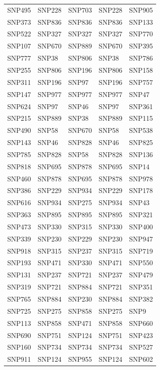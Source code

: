 \begin{table}[ht]
\begin{tabular}{lllll}
  SNP495 & SNP228 & SNP703 & SNP228 & SNP905 \\ 
  SNP373 & SNP836 & SNP836 & SNP836 & SNP133 \\ 
  SNP522 & SNP327 & SNP327 & SNP327 & SNP770 \\ 
  SNP107 & SNP670 & SNP889 & SNP670 & SNP395 \\ 
  SNP777 & SNP38 & SNP806 & SNP38 & SNP786 \\ 
  SNP255 & SNP806 & SNP196 & SNP806 & SNP158 \\ 
  SNP311 & SNP196 & SNP97 & SNP196 & SNP757 \\ 
  SNP147 & SNP977 & SNP977 & SNP977 & SNP47 \\ 
  SNP624 & SNP97 & SNP46 & SNP97 & SNP361 \\ 
  SNP215 & SNP889 & SNP38 & SNP889 & SNP115 \\ 
  SNP490 & SNP58 & SNP670 & SNP58 & SNP538 \\ 
  SNP143 & SNP46 & SNP828 & SNP46 & SNP825 \\ 
  SNP785 & SNP828 & SNP58 & SNP828 & SNP136 \\ 
  SNP818 & SNP695 & SNP878 & SNP695 & SNP14 \\ 
  SNP460 & SNP878 & SNP695 & SNP878 & SNP978 \\ 
  SNP386 & SNP229 & SNP934 & SNP229 & SNP178 \\ 
  SNP616 & SNP934 & SNP275 & SNP934 & SNP43 \\ 
  SNP363 & SNP895 & SNP895 & SNP895 & SNP321 \\ 
  SNP473 & SNP330 & SNP315 & SNP330 & SNP400 \\ 
  SNP339 & SNP230 & SNP229 & SNP230 & SNP947 \\ 
  SNP918 & SNP315 & SNP237 & SNP315 & SNP719 \\ 
  SNP193 & SNP471 & SNP330 & SNP471 & SNP550 \\ 
  SNP131 & SNP237 & SNP721 & SNP237 & SNP479 \\ 
  SNP319 & SNP721 & SNP884 & SNP721 & SNP351 \\ 
  SNP765 & SNP884 & SNP230 & SNP884 & SNP382 \\ 
  SNP725 & SNP275 & SNP858 & SNP275 & SNP9 \\ 
  SNP113 & SNP858 & SNP471 & SNP858 & SNP660 \\ 
  SNP690 & SNP751 & SNP124 & SNP751 & SNP423 \\ 
  SNP160 & SNP734 & SNP734 & SNP734 & SNP527 \\ 
  SNP911 & SNP124 & SNP955 & SNP124 & SNP602 \\ 

\end{tabular}
\end{table}
